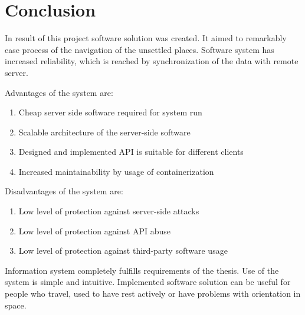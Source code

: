 \documentclass[thesis=M,english]{FITthesis}[2012/10/20]
\begin{document}
\chapter{Conclusion}

In result of this project software solution was created. It aimed to remarkably ease process of the navigation of the unsettled places.
Software system has increased reliability, which is reached by synchronization of the data with remote server.

Advantages of the system are:
\begin{enumerate}
	\item	Cheap server side software required for system run
	\item	Scalable architecture of the server-side software
	\item	Designed and implemented API is suitable for different clients
	\item	Increased maintainability by usage of containerization 
\end{enumerate}

Disadvantages of the system are:

\begin{enumerate}
	\item	Low level of protection against server-side attacks
	\item	Low level of protection against API abuse
	\item	Low level of protection against third-party software usage
\end{enumerate}

Information system completely fulfills requirements of the thesis.
Use of the system is simple and intuitive. Implemented software solution can be useful for people who travel, used to have rest actively or have problems with orientation in space. 
\end{document}
